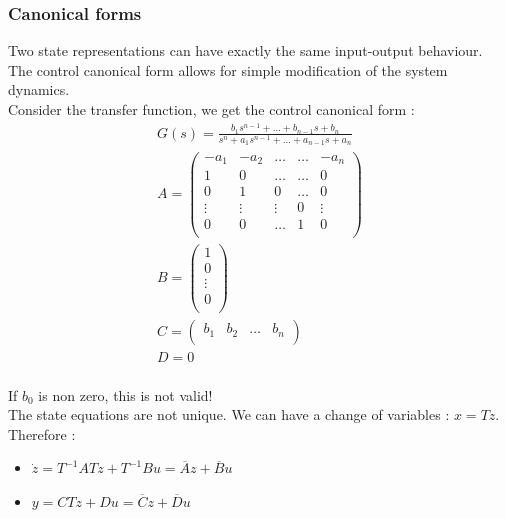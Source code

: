 \documentclass[../main.tex]{subfiles}
\begin{document}
\subsubsection{Canonical forms}
Two state representations can have exactly the same input-output behaviour.\\
The control canonical form allows for simple modification of the system dynamics.\\
Consider the transfer function, we get the control canonical form : \begin{equation}
    \begin{gathered}
        G(s) = \frac{b_1s^{n-1} + \dots + b_{n-1}s + b_n}{s^n + a_1 s^{n-1} + \dots + a_{n-1}s+a_n}\\
        A = \begin{pmatrix}
            -a_1 & -a_2 & \dots & \dots & -a_n\\
            1 & 0 & \dots & \dots & 0\\
            0 & 1 & 0 & \dots & 0\\
            \vdots & \vdots & \vdots & 0 & \vdots\\
            0 & 0 & \dots & 1 & 0\\
        \end{pmatrix}\\
        B = \begin{pmatrix}
            1\\ 0 \\ \vdots \\ 0\\
        \end{pmatrix}\\
        C = \begin{pmatrix}
            b_1 & b_2 & \dots & b_n\\
        \end{pmatrix}\\
        D = 0\\
    \end{gathered}
\end{equation}

\warning If $b_0$ is non zero, this is not valid!\\

The state equations are not unique. We can have a change of variables : $x=Tz$. Therefore : \begin{itemize}
    \item $\dot{z} = T^{-1}ATz + T^{-1}Bu = \overline{A} z + \overline{B}u$\\
    \item $y = CTz + Du = \overline{C} z  + \overline{D}u$\\
\end{itemize}
\end{document}
